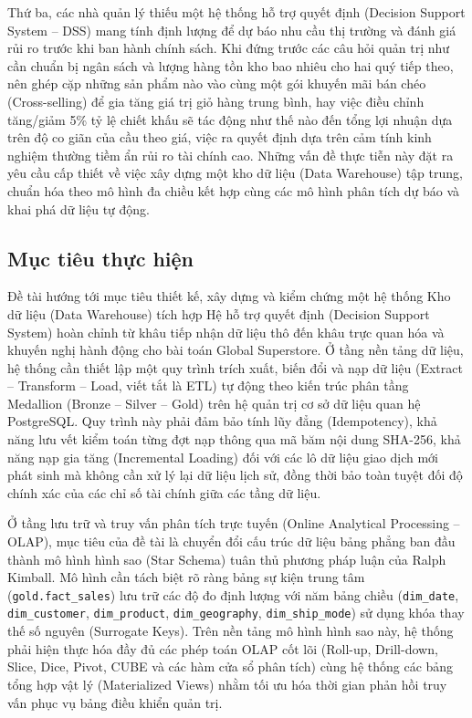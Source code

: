Thứ ba, các nhà quản lý thiếu một hệ thống hỗ trợ quyết định (Decision Support System -- DSS) mang tính định lượng để dự báo nhu cầu thị trường và đánh giá rủi ro trước khi ban hành chính sách. Khi đứng trước các câu hỏi quản trị như cần chuẩn bị ngân sách và lượng hàng tồn kho bao nhiêu cho hai quý tiếp theo, nên ghép cặp những sản phẩm nào vào cùng một gói khuyến mãi bán chéo (Cross-selling) để gia tăng giá trị giỏ hàng trung bình, hay việc điều chỉnh tăng/giảm 5\% tỷ lệ chiết khấu sẽ tác động như thế nào đến tổng lợi nhuận dựa trên độ co giãn của cầu theo giá, việc ra quyết định dựa trên cảm tính kinh nghiệm thường tiềm ẩn rủi ro tài chính cao. Những vấn đề thực tiễn này đặt ra yêu cầu cấp thiết về việc xây dựng một kho dữ liệu (Data Warehouse) tập trung, chuẩn hóa theo mô hình đa chiều kết hợp cùng các mô hình phân tích dự báo và khai phá dữ liệu tự động.

\subsection{Mục tiêu thực hiện}

Đề tài hướng tới mục tiêu thiết kế, xây dựng và kiểm chứng một hệ thống Kho dữ liệu (Data Warehouse) tích hợp Hệ hỗ trợ quyết định (Decision Support System) hoàn chỉnh từ khâu tiếp nhận dữ liệu thô đến khâu trực quan hóa và khuyến nghị hành động cho bài toán Global Superstore. Ở tầng nền tảng dữ liệu, hệ thống cần thiết lập một quy trình trích xuất, biến đổi và nạp dữ liệu (Extract -- Transform -- Load, viết tắt là ETL) tự động theo kiến trúc phân tầng Medallion (Bronze -- Silver -- Gold) trên hệ quản trị cơ sở dữ liệu quan hệ PostgreSQL. Quy trình này phải đảm bảo tính lũy đẳng (Idempotency), khả năng lưu vết kiểm toán từng đợt nạp thông qua mã băm nội dung SHA-256, khả năng nạp gia tăng (Incremental Loading) đối với các lô dữ liệu giao dịch mới phát sinh mà không cần xử lý lại dữ liệu lịch sử, đồng thời bảo toàn tuyệt đối độ chính xác của các chỉ số tài chính giữa các tầng dữ liệu.

Ở tầng lưu trữ và truy vấn phân tích trực tuyến (Online Analytical Processing -- OLAP), mục tiêu của đề tài là chuyển đổi cấu trúc dữ liệu bảng phẳng ban đầu thành mô hình hình sao (Star Schema) tuân thủ phương pháp luận của Ralph Kimball. Mô hình cần tách biệt rõ ràng bảng sự kiện trung tâm (\texttt{gold.fact\_sales}) lưu trữ các độ đo định lượng với năm bảng chiều (\texttt{dim\_date}, \texttt{dim\_customer}, \texttt{dim\_product}, \texttt{dim\_geography}, \texttt{dim\_ship\_mode}) sử dụng khóa thay thế số nguyên (Surrogate Keys). Trên nền tảng mô hình hình sao này, hệ thống phải hiện thực hóa đầy đủ các phép toán OLAP cốt lõi (Roll-up, Drill-down, Slice, Dice, Pivot, CUBE và các hàm cửa sổ phân tích) cùng hệ thống các bảng tổng hợp vật lý (Materialized Views) nhằm tối ưu hóa thời gian phản hồi truy vấn phục vụ bảng điều khiển quản trị.

